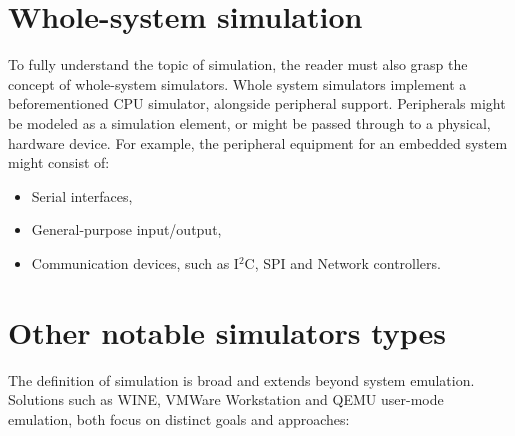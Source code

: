 \section{Whole-system simulation}

To fully understand the topic of simulation, the reader must also grasp the concept of whole-system simulators. Whole
system simulators implement a beforementioned CPU simulator, alongside peripheral support. Peripherals might be
modeled as a simulation element, or might be passed through to a physical, hardware device. For example, the peripheral
equipment for an embedded system might consist of:
\begin{itemize}
	\item{Serial interfaces,}
	\item{General-purpose input/output,}
	\item{Communication devices, such as I$^2$C, SPI and Network controllers.}
\end{itemize}

\pagebreak
\section{Other notable simulators types}

The definition of simulation is broad and extends beyond system emulation. Solutions such as WINE, VMWare Workstation
and QEMU user-mode emulation, both focus on distinct goals and approaches:


